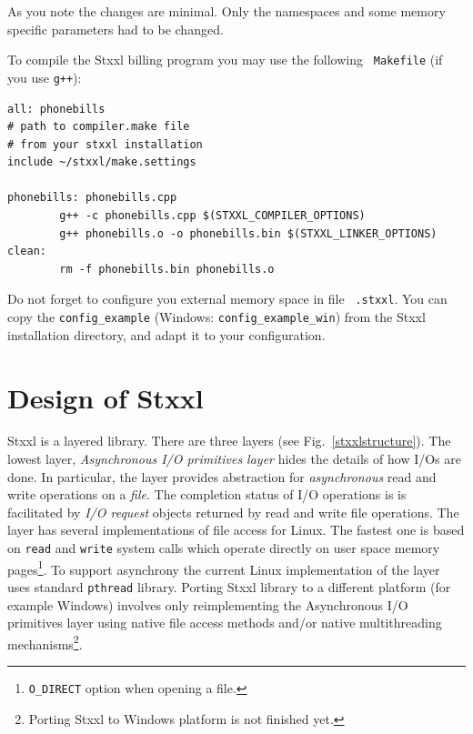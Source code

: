 \documentclass[twoside]{book}
\newcommand{\stxxl}{{\sc Stxxl} }
\begin{document}
As you note the changes are minimal. Only the namespaces and some
memory specific parameters had to be changed.

To compile the \stxxl billing program you may use the following {\tt
Makefile} (if you use {\tt g++}): 


\begin{verbatim}
all: phonebills
# path to compiler.make file
# from your stxxl installation
include ~/stxxl/make.settings                

phonebills: phonebills.cpp
        g++ -c phonebills.cpp $(STXXL_COMPILER_OPTIONS)
        g++ phonebills.o -o phonebills.bin $(STXXL_LINKER_OPTIONS)
clean:
        rm -f phonebills.bin phonebills.o
\end{verbatim}


Do not forget to configure you external memory space in file {\tt
.stxxl}. You can copy the {\tt config\_example} (Windows: {\tt config\_example\_win}) from the \stxxl
installation directory, and adapt it to your configuration.




\chapter{Design of \stxxl}

\stxxl is a layered library. There are three layers (see
Fig.~\ref{stxxlstructure}). The lowest layer, 
\emph{Asynchronous I/O primitives layer} hides the details of how I/Os
are done. In particular, the layer provides abstraction for
\emph{asynchronous} read and write operations on a \emph{file}. The
completion status of I/O operations is  
is facilitated by \emph{I/O request} objects returned by
read and write file operations. 
The layer has several implementations of file access for Linux. The
fastest one is based on {\tt read} and {\tt write} system calls which
operate directly on user space memory pages\footnote{{\tt O\_DIRECT}
option when opening a file.}.
To support asynchrony the current
Linux implementation of the layer uses standard {\tt pthread} library.
Porting \stxxl library to a different platform (for example
Windows) involves only reimplementing the Asynchronous I/O primitives
layer using native file access methods and/or native
multithreading mechanisms\footnote{Porting \stxxl to Windows platform
is not finished yet.}.
\end{document}
